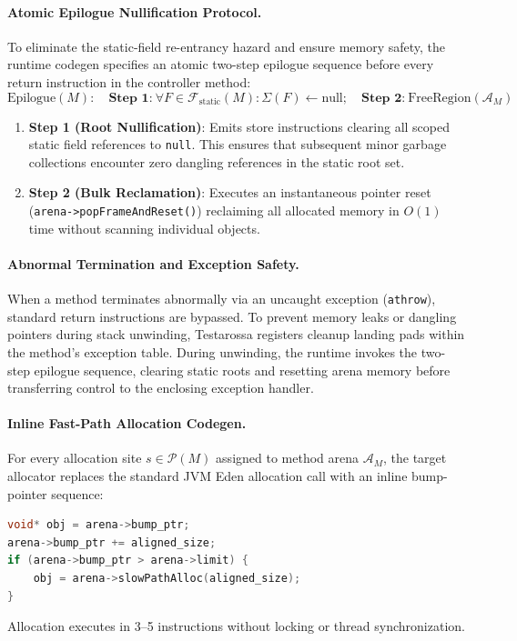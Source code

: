 \documentclass[12pt,a4paper]{article}
\begin{document}
\paragraph{Atomic Epilogue Nullification Protocol.}
To eliminate the static-field re-entrancy hazard and ensure memory safety, the runtime codegen specifies an atomic two-step epilogue sequence before every return instruction in the controller method:
\begin{equation}
\text{Epilogue}(M): \quad \textbf{Step 1:} \ \forall F \in \mathcal{F}_{\text{static}}(M): \Sigma(F) \gets \text{null}; \quad \textbf{Step 2:} \ \text{FreeRegion}(\mathcal{A}_M)
\end{equation}
\begin{enumerate}[leftmargin=*]
  \item \textbf{Step 1 (Root Nullification)}: Emits store instructions clearing all scoped static field references to \texttt{null}. This ensures that subsequent minor garbage collections encounter zero dangling references in the static root set.
  \item \textbf{Step 2 (Bulk Reclamation)}: Executes an instantaneous pointer reset (\lstinline|arena->popFrameAndReset()|) reclaiming all allocated memory in $O(1)$ time without scanning individual objects.
\end{enumerate}

\paragraph{Abnormal Termination and Exception Safety.}
When a method terminates abnormally via an uncaught exception (\texttt{athrow}), standard return instructions are bypassed. To prevent memory leaks or dangling pointers during stack unwinding, Testarossa registers cleanup landing pads within the method's exception table. During unwinding, the runtime invokes the two-step epilogue sequence, clearing static roots and resetting arena memory before transferring control to the enclosing exception handler.

\paragraph{Inline Fast-Path Allocation Codegen.}
For every allocation site $s \in \mathcal{P}(M)$ assigned to method arena $\mathcal{A}_M$, the target allocator replaces the standard JVM Eden allocation call with an inline bump-pointer sequence:
\begin{lstlisting}[language=C++]
void* obj = arena->bump_ptr;
arena->bump_ptr += aligned_size;
if (arena->bump_ptr > arena->limit) {
    obj = arena->slowPathAlloc(aligned_size);
}
\end{lstlisting}
Allocation executes in 3--5 instructions without locking or thread synchronization.
\end{document}
